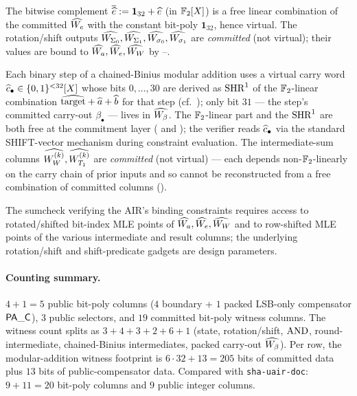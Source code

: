 \begin{remark}\label{rem:virtual-cols}
The bitwise complement $\overline{\widehat{e}} := \mathbf{1}_{32} + \widehat{e}$
(in $\mathbb{F}_2[X]$) is a free linear combination of the committed
$\widehat{W_e}$ with the constant bit-poly $\mathbf{1}_{32}$, hence
virtual. The rotation/shift outputs
$\widehat{W_{\Sigma_0}}, \widehat{W_{\Sigma_1}}, \widehat{W_{\sigma_0}},
\widehat{W_{\sigma_1}}$ are \emph{committed} (not virtual); their values
are bound to $\widehat{W_a}, \widehat{W_e}, \widehat{W_W}$ by
--.

Each binary step of a chained-Binius modular addition uses a virtual
carry word $\widehat{c}_\bullet \in \{0,1\}^{<32}[X]$ whose bits $0, \dots, 30$
are derived as $\operatorname{SHR}^{1}$ of the $\mathbb{F}_2$-linear combination
$\widehat{\mathrm{target}} + \widehat{a} + \widehat{b}$ for that step (cf.\
); only bit $31$ — the step's committed carry-out
$\beta_\bullet$ — lives in $\widehat{W_\beta}$. The $\mathbb{F}_2$-linear part and
the $\operatorname{SHR}^{1}$ are both free at the commitment layer
( and ); the verifier reads
$\widehat{c}_\bullet$ via the standard SHIFT-vector mechanism during
constraint evaluation. The intermediate-sum columns
$\widehat{W_W^{(k)}}, \widehat{W_{T_1}^{(k)}}$ are \emph{committed} (not
virtual) — each depends non-$\mathbb{F}_2$-linearly on the carry chain of
prior inputs and so cannot be reconstructed from a free combination
of committed columns (\Cref{prop:binius-chain-count}).

The sumcheck verifying the AIR's binding constraints requires access
to rotated/shifted bit-index MLE points of $\widehat{W_a}, \widehat{W_e},
\widehat{W_W}$ and to row-shifted MLE points of the various intermediate
and result columns; the underlying rotation/shift and shift-predicate
gadgets are design parameters.
\end{remark}

\paragraph{Counting summary.}
$4 + 1 = 5$ public bit-poly columns ($4$ boundary + $1$ packed
LSB-only compensator $\mathsf{PA\_C}$), $3$ public selectors, and $19$
committed bit-poly witness columns. The witness count splits as
$3 + 4 + 3 + 2 + 6 + 1$ (state, rotation/shift, $\operatorname{AND}$,
round-intermediate, chained-Binius intermediates, packed carry-out
$\widehat{W_\beta}$). Per row, the modular-addition witness footprint is
$6 \cdot 32 + 13 = 205$ bits of committed data plus $13$ bits of
public-compensator data. Compared with \texttt{sha-uair-doc}:
$9 + 11 = 20$ bit-poly columns and $9$ public integer columns.

